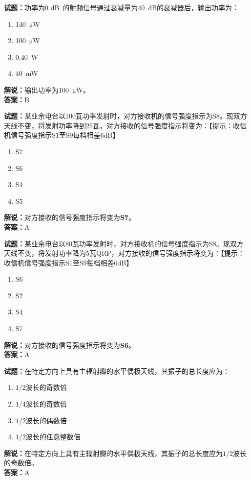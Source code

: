 \documentclass{ctexbook}
\begin{document}
\vspace{1em}

\textbf{试题：}功率为\num{0} \unit[qualifier-mode=combine]{\deci\bel{}}的射频信号通过衰减量为\SI{40}{\dB}的衰减器后，输出功率为：
\begin{enumerate}[leftmargin=3em]
  \item \SI{140}{\uW}
  \item \SI{100}{\uW}
  \item \SI{0.40}{\W}  %
  \item \SI{40}{\mW}
\end{enumerate}
\noindent\textbf{解说：}输出功率为\SI{100}{\uW}。\\
\noindent\textbf{答案：}B

\vspace{1em}

\textbf{试题：}某业余电台以\num{100}瓦功率发射时，对方接收机的信号强度指示为S8。现双方天线不变，将发射功率降到\num{25}瓦，对方接收的信号强度指示将变为：【提示：收信机信号强度指示S1至S9每档相差6dB】
\begin{enumerate}[leftmargin=3em]
  \item S7
  \item S6
  \item S4
  \item S5
\end{enumerate}
\noindent\textbf{解说：}对方接收的信号强度指示将变为\textbf{S7}。\\\noindent\textbf{答案：}A

\vspace{1em}

\textbf{试题：}某业余电台以\num{80}瓦功率发射时，对方接收机的信号强度指示为S8。现双方天线不变，将发射功率降为\num{5}瓦QRP，对方接收的信号强度指示将变为：【提示：收信机信号强度指示S1至S9每档相差6dB】
\begin{enumerate}[leftmargin=3em]
  \item S6
  \item S2
  \item S4
  \item S7
\end{enumerate}
\noindent\textbf{解说：}对方接收的信号强度指示将变为\textbf{S6}。\\\noindent\textbf{答案：}A

\vspace{1em}

\textbf{试题：}在特定方向上具有主辐射瓣的水平偶极天线，其振子的总长度应为：
\begin{enumerate}[leftmargin=3em]
  \item \(1/2\)波长的奇数倍
  \item \(1/4\)波长的奇数倍
  \item \(1/2\)波长的偶数倍
  \item \(1/2\)波长的任意整数倍
\end{enumerate}
\noindent\textbf{解说：}在特定方向上具有主辐射瓣的水平偶极天线，其振子的总长度应为\(1/2\)波长的奇数倍。\\\noindent\textbf{答案：}A
\end{document}
